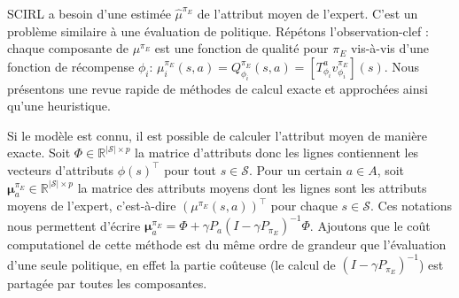 \documentclass[english,utf8]{./hermes-journal}
\newcommand{\s}{\mathcal{S}}
\newcommand{\A}{\mathcal{A}}
\newcommand{\Mu}{\boldsymbol{\mu}}
\begin{document}
SCIRL a besoin d'une estimée $\hat{\mu}^{\pi_E}$ de l'attribut moyen de l'expert. C'est un problème similaire à une évaluation de politique. Répétons l'observation-clef : chaque composante de 
$\mu^{\pi_E}$ est une fonction de qualité pour $\pi_E$ vis-à-vis d'une fonction de récompense $\phi_i$: $\mu_i^{\pi_E}(s,a) = Q^{\pi_E}_{\phi_i}(s,a) =
[T^a_{\phi_i} v^{\pi_E}_{\phi_i}](s)$. Nous présentons une revue rapide de méthodes de calcul exacte et approchées ainsi qu'une heuristique.

Si le modèle est connu, il est possible de calculer l'attribut moyen de manière exacte. Soit $\Phi\in\mathbb{R}^{|\s|\times p}$ la matrice d'attributs donc les lignes contiennent les vecteurs d'attributs $\phi(s)^\top$ pour tout
$s\in\s$.
%
%
Pour un certain $a\in A$, soit $\Mu^{\pi_E}_a \in\mathbb{R}^{|\s|\times
p}$ la matrice des attributs moyens dont les lignes sont les attributs moyens de l'expert, c'est-à-dire  $(\mu^{\pi_E}(s,a))^\top$ pour chaque $s\in\s$.
Ces notations nous permettent d'écrire $\Mu_a^{\pi_E} = \Phi + \gamma
P_a(I-\gamma P_{\pi_E})^{-1} \Phi$.
Ajoutons que le coût computationel de cette méthode est du même ordre de grandeur que l'évaluation d'une seule politique, en effet la partie coûteuse (le calcul de $(I-\gamma P_{\pi_E})^{-1}$) est partagée par toutes les composantes.
\end{document}
